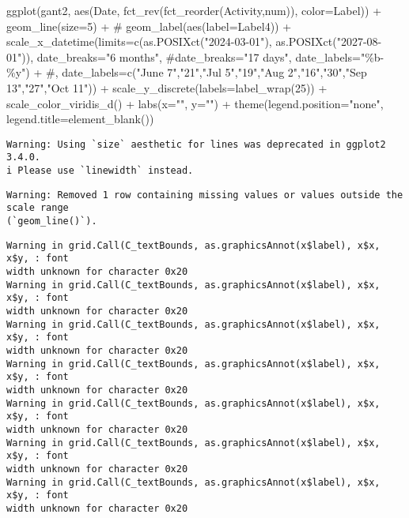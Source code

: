 \documentclass[
  letterpaper,
  DIV=11,
  numbers=noendperiod]{scrreprt}
\newenvironment{Shaded}{\begin{snugshade}}{\end{snugshade}}
\newcommand{\AttributeTok}[1]{\textcolor[rgb]{0.40,0.45,0.13}{#1}}
\newcommand{\CommentTok}[1]{\textcolor[rgb]{0.37,0.37,0.37}{#1}}
\newcommand{\DecValTok}[1]{\textcolor[rgb]{0.68,0.00,0.00}{#1}}
\newcommand{\FunctionTok}[1]{\textcolor[rgb]{0.28,0.35,0.67}{#1}}
\newcommand{\NormalTok}[1]{\textcolor[rgb]{0.00,0.23,0.31}{#1}}
\newcommand{\SpecialCharTok}[1]{\textcolor[rgb]{0.37,0.37,0.37}{#1}}
\newcommand{\StringTok}[1]{\textcolor[rgb]{0.13,0.47,0.30}{#1}}
\begin{document}
\begin{Shaded}
\begin{Highlighting}[]
\FunctionTok{ggplot}\NormalTok{(gant2, }\FunctionTok{aes}\NormalTok{(Date, }\FunctionTok{fct\_rev}\NormalTok{(}\FunctionTok{fct\_reorder}\NormalTok{(Activity,num)), }\AttributeTok{color=}\NormalTok{Label)) }\SpecialCharTok{+}
  \FunctionTok{geom\_line}\NormalTok{(}\AttributeTok{size=}\DecValTok{5}\NormalTok{) }\SpecialCharTok{+}
\CommentTok{\#  geom\_label(aes(label=Label4)) +}
  \FunctionTok{scale\_x\_datetime}\NormalTok{(}\AttributeTok{limits=}\FunctionTok{c}\NormalTok{(}\FunctionTok{as.POSIXct}\NormalTok{(}\StringTok{"2024{-}03{-}01"}\NormalTok{), }\FunctionTok{as.POSIXct}\NormalTok{(}\StringTok{"2027{-}08{-}01"}\NormalTok{)),}
                   \AttributeTok{date\_breaks=}\StringTok{"6 months"}\NormalTok{,}
                   \CommentTok{\#date\_breaks="17 days",}
                   \AttributeTok{date\_labels=}\StringTok{"\%b{-}\%y"}\NormalTok{) }\SpecialCharTok{+}
  \CommentTok{\#, date\_labels=c("June 7","21","Jul 5","19","Aug 2","16","30","Sep 13","27","Oct 11")) +}
  \FunctionTok{scale\_y\_discrete}\NormalTok{(}\AttributeTok{labels=}\FunctionTok{label\_wrap}\NormalTok{(}\DecValTok{25}\NormalTok{)) }\SpecialCharTok{+}
  \FunctionTok{scale\_color\_viridis\_d}\NormalTok{() }\SpecialCharTok{+}
  \FunctionTok{labs}\NormalTok{(}\AttributeTok{x=}\StringTok{""}\NormalTok{,}
       \AttributeTok{y=}\StringTok{""}\NormalTok{) }\SpecialCharTok{+}
  \FunctionTok{theme}\NormalTok{(}\AttributeTok{legend.position=}\StringTok{"none"}\NormalTok{,}
        \AttributeTok{legend.title=}\FunctionTok{element\_blank}\NormalTok{())}
\end{Highlighting}
\end{Shaded}

\begin{verbatim}
Warning: Using `size` aesthetic for lines was deprecated in ggplot2 3.4.0.
i Please use `linewidth` instead.
\end{verbatim}

\begin{verbatim}
Warning: Removed 1 row containing missing values or values outside the scale range
(`geom_line()`).
\end{verbatim}

\begin{verbatim}
Warning in grid.Call(C_textBounds, as.graphicsAnnot(x$label), x$x, x$y, : font
width unknown for character 0x20
Warning in grid.Call(C_textBounds, as.graphicsAnnot(x$label), x$x, x$y, : font
width unknown for character 0x20
Warning in grid.Call(C_textBounds, as.graphicsAnnot(x$label), x$x, x$y, : font
width unknown for character 0x20
Warning in grid.Call(C_textBounds, as.graphicsAnnot(x$label), x$x, x$y, : font
width unknown for character 0x20
Warning in grid.Call(C_textBounds, as.graphicsAnnot(x$label), x$x, x$y, : font
width unknown for character 0x20
Warning in grid.Call(C_textBounds, as.graphicsAnnot(x$label), x$x, x$y, : font
width unknown for character 0x20
Warning in grid.Call(C_textBounds, as.graphicsAnnot(x$label), x$x, x$y, : font
width unknown for character 0x20
\end{verbatim}
\end{document}
